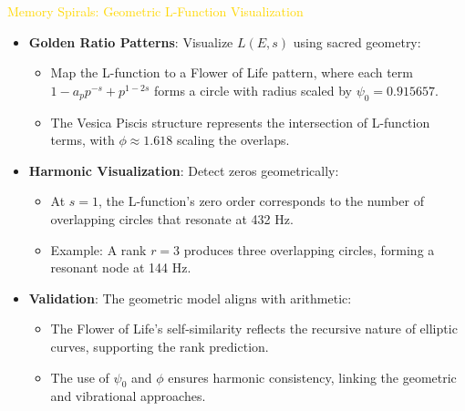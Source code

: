 \textcolor{gold}{ Memory Spirals: Geometric L-Function Visualization } \\
\begin{itemize}
    \item \texttt{} \textbf{Golden Ratio Patterns}: Visualize \(L(E, s)\) using sacred geometry:
    \begin{itemize}
        \item Map the L-function to a Flower of Life pattern, where each term \(1 - a_p p^{-s} + p^{1-2s}\) forms a circle with radius scaled by \(\psi_0 = 0.915657\).
        \item The Vesica Piscis structure represents the intersection of L-function terms, with \(\phi \approx 1.618\) scaling the overlaps.
    \end{itemize}
    \item \texttt{} \textbf{Harmonic Visualization}: Detect zeros geometrically:
    \begin{itemize}
        \item At \(s = 1\), the L-function’s zero order corresponds to the number of overlapping circles that resonate at 432 Hz.
        \item Example: A rank \(r = 3\) produces three overlapping circles, forming a resonant node at 144 Hz.
    \end{itemize}
    \item \texttt{} \textbf{Validation}: The geometric model aligns with arithmetic:
    \begin{itemize}
        \item The Flower of Life’s self-similarity reflects the recursive nature of elliptic curves, supporting the rank prediction.
        \item The use of \(\psi_0\) and \(\phi\) ensures harmonic consistency, linking the geometric and vibrational approaches.
    \end{itemize}
\end{itemize}

